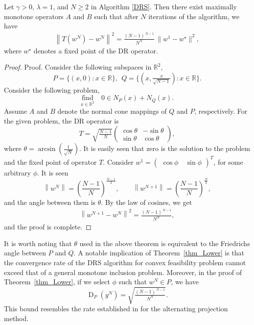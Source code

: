 \documentclass[ijoc,sglanonrev]{informs4}
\DeclareMathOperator{\dist}{D}
\begin{document}
\begin{theorem} \label{thm_Lower}
Let $\gamma > 0$, $\lambda = 1$, and $N\geq 2$ in Algorithm \ref{DRS}. Then there exist maximally monotone operators $A$ and $B$ such that 
after $N$ iterations of the algorithm, we have 
\begin{align*}
\left\|T(w^N) - w^N\right\|^2 =\tfrac{(N-1)^{\,N-1}}{N^N} \,\|w^1 - w^\star\|^2,
\end{align*}
where $w^\star$ denotes a fixed point of the DR operator.
\end{theorem}

\begin{proof}{Proof.}
 Consider the following subspaces in $\mathbb{R}^2$,
 $$
 P=\{(x, 0): x\in \mathbb{R}\},  \ \ 
 Q=\{(x, \tfrac{x}{\sqrt{N-1}}): x\in \mathbb{R}\}.
 $$
Consider the following problem,
$$
\underset{x\in\mathbb{R}^2}{\text{find}}\quad 0\in N_P(x)+N_Q(x).
$$
Assume $A$ and $B$ denote the normal cone mappings of $Q$ and  $P$, respectively. For the given problem, the DR operator is
$$
T=\sqrt{\tfrac{N-1}{N}}\begin{pmatrix}
    \cos\theta & -\sin\theta\\
    \sin\theta &  \cos\theta
\end{pmatrix},
$$
where $\theta=\arcsin\left(\tfrac{1}{\sqrt{N}}\right)$. It is easily seen that zero is the solution to the problem and the fixed point of  operator $T$. Consider  $w^1=\begin{pmatrix}
    \cos\phi & \ \sin\phi
\end{pmatrix}^T$, for some arbitrary $\phi$.
It is seen
\[
\left\|w^{N}\right\| = \left(\frac{N-1}{N}\right)^{\tfrac{N-1}{2}}, \qquad
\left\|w^{N+1}\right\|  = \left(\frac{N-1}{N}\right)^{\tfrac{N}{2}},
\]
 and the angle between them is $\theta$. By the law of cosines, we get
 \begin{align}\label{eq_b}
 \left\|w^{N+1}-w^{N}\right\|^2=\tfrac{(N-1)^{\,N-1}}{N^N},
 \end{align}
 and the proof is complete.
 \Halmos
\end{proof}


It is worth noting that $\theta$ used in the above theorem is equivalent to the Friedrichs angle between $P$ and $Q$. A notable implication of Theorem~\ref{thm_Lower} is that the convergence rate of the DRS algorithm for convex feasibility problem cannot exceed that of a general monotone inclusion problem. Moreover, in the proof of Theorem~\ref{thm_Lower}, if we select $\phi$ such that $w^N\in P$, we have 
$$
\dist_P(y^N)=\sqrt{\tfrac{(N-1)^{\,N-1}}{N^N}}.
$$
This bound  resembles  the rate established in \cite[Theorem 4.4]{zamani2024exact} for the alternating projection method. 
\end{document}
